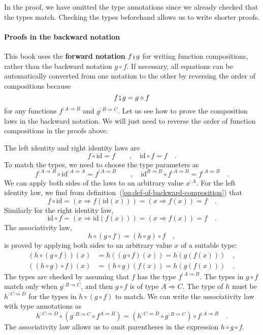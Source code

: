 In the proof, we have omitted the type annotations since we already
checked that the types match. Checking the types beforehand allows
us to write shorter proofs.

\paragraph{Proofs in the backward notation}

This book uses the \textbf{forward notation}
$f\bef g$ for writing function compositions, rather than the backward
notation $g\circ f$. If necessary, all equations can be automatically
converted from one notation to the other by reversing the order of
compositions because
\[
f\bef g=g\circ f
\]
for any functions $f^{:A\Rightarrow B}$ and $g^{:B\Rightarrow C}$.
Let us see how to prove the composition laws in the backward notation.
We will just need to reverse the order of function compositions in
the proofs above.

The left identity and right identity laws are
\[
f\circ\text{id}=f\quad\quad,\quad\text{id}\circ f=f\quad.
\]
To match the types, we need to choose the type parameters as
\[
f^{:A\Rightarrow B}\circ\text{id}^{:A\Rightarrow A}=f^{:A\Rightarrow B}\quad\quad,\quad\text{id}^{B\Rightarrow B}\circ f^{:A\Rightarrow B}=f^{:A\Rightarrow B}\quad.
\]
We can apply both sides of the laws to an arbitrary value $x^{:A}$.
For the left identity law, we find from definition~(\ref{eq:def-of-backward-composition})
that
\[
f\circ\text{id}=\left(x\Rightarrow f(\text{id}(x))\right)=\left(x\Rightarrow f(x)\right)=f\quad.
\]
Similarly for the right identity law,
\[
\text{id}\circ f=\left(x\Rightarrow\text{id}\left(f\left(x\right)\right)\right)=\left(x\Rightarrow f\left(x\right)\right)=f\quad.
\]
The associativity law,
\[
h\circ\left(g\circ f\right)=\left(h\circ g\right)\circ f\quad,
\]
is proved by applying both sides to an arbitrary value $x$ of a suitable
type:
\begin{align*}
\left(h\circ\left(g\circ f\right)\right)(x) & =h\left(\left(g\circ f\right)(x)\right)=h\left(g\left(f\left(x\right)\right)\right)\quad,\\
\left(\left(h\circ g\right)\circ f\right)(x) & =\left(h\circ g\right)\left(f(x)\right)=h\left(g\left(f\left(x\right)\right)\right)\quad.
\end{align*}
The types are checked by assuming that $f$ has the type $f^{:A\Rightarrow B}$.
The types in $g\circ f$ match only when $g^{:B\Rightarrow C}$, and
then $g\circ f$ is of type $A\Rightarrow C$. The type of $h$ must
be $h^{:C\Rightarrow D}$ for the types in $h\circ\left(g\circ f\right)$
to match. We can write the associativity law with type annotations
as
\begin{equation}
h^{:C\Rightarrow D}\circ(g^{:B\Rightarrow C}\circ f^{A\Rightarrow B})=(h^{:C\Rightarrow D}\circ g^{:B\Rightarrow C})\circ f^{:A\Rightarrow B}\quad.\label{eq:assoc-law-for-composition-with-types-backward}
\end{equation}
The associativity law allows us to omit parentheses in the expression
$h\circ g\circ f$. 

